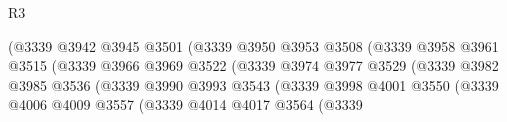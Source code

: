 \begin{lexlean}{R3}
\begin{coremodule}
                                                (@3339
                                                  @3942
                                                  @3945
                                                  @3501
                                                  (@3339
                                                    @3950
                                                    @3953
                                                    @3508
                                                    (@3339
                                                      @3958
                                                      @3961
                                                      @3515
                                                      (@3339
                                                        @3966
                                                        @3969
                                                        @3522
                                                        (@3339
                                                          @3974
                                                          @3977
                                                          @3529
                                                          (@3339
                                                            @3982
                                                            @3985
                                                            @3536
                                                            (@3339
                                                              @3990
                                                              @3993
                                                              @3543
                                                              (@3339
                                                                @3998
                                                                @4001
                                                                @3550
                                                                (@3339
                                                                  @4006
                                                                  @4009
                                                                  @3557
                                                                  (@3339
                                                                    @4014
                                                                    @4017
                                                                    @3564
                                                                    (@3339

\end{coremodule}
\end{lexlean}
